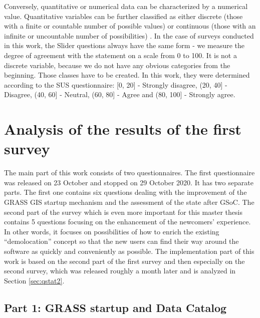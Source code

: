 \documentclass[a4paper,10pt,twoside]{article}
\begin{document}
Conversely, quantitative or numerical data can be characterized by a numerical value. Quantitative variables can be further classified as either discrete (those with a finite or countable number of possible values) or continuous (those with an infinite or uncountable number of possibilities) \cite{wisconsin1}. In the case of surveys conducted in this work, the Slider questions always have the same form - we measure the degree of agreement with the statement on a scale from 0 to 100. It is not a discrete variable, because we do not have any obvious categories from the beginning. Those classes have to be created. In this work, they were determined according to the SUS questionnaire: [0, 20] - Strongly disagree, (20, 40] - Disagree, (40, 60] - Neutral, (60, 80] - Agree and (80, 100] - Strongly agree.




\newpage
\vspace*{-1cm}
\section{Analysis of the results of the first survey}
\label{sec:qstat}

\noindent The main part of this work consists of two questionnaires. The first questionnaire was released on 23 October and stopped on 29 October 2020. It has two separate parts. The first one contains six questions dealing with the improvement of the GRASS GIS startup mechanism and the assessment of the state after GSoC. The second part of the survey which is even more important for this master thesis contains 5 questions focusing on the enhancement of the newcomers' experience. In other words, it focuses on possibilities of how to enrich the existing ``demolocation'' concept so that the new users can find their way around the software as quickly and conveniently as possible. The implementation part of this work is based on the second part of the first survey and then especially on the second survey, which was released roughly a month later and is analyzed in Section \ref{sec:qstat2}.

\subsection{Part 1: GRASS startup and Data Catalog}
\end{document}

